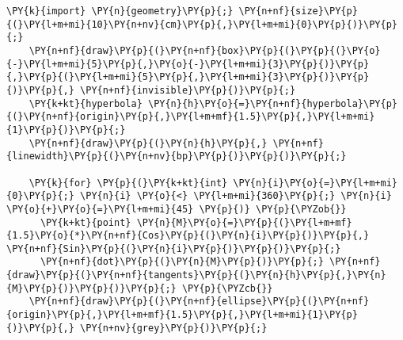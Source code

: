 \begin{Verbatim}[commandchars=\\\{\}]
    \PY{k}{import} \PY{n}{geometry}\PY{p}{;} \PY{n+nf}{size}\PY{p}{(}\PY{l+m+mi}{10}\PY{n+nv}{cm}\PY{p}{,}\PY{l+m+mi}{0}\PY{p}{)}\PY{p}{;}
    \PY{n+nf}{draw}\PY{p}{(}\PY{n+nf}{box}\PY{p}{(}\PY{p}{(}\PY{o}{-}\PY{l+m+mi}{5}\PY{p}{,}\PY{o}{-}\PY{l+m+mi}{3}\PY{p}{)}\PY{p}{,}\PY{p}{(}\PY{l+m+mi}{5}\PY{p}{,}\PY{l+m+mi}{3}\PY{p}{)}\PY{p}{)}\PY{p}{,} \PY{n+nf}{invisible}\PY{p}{)}\PY{p}{;}
    \PY{k+kt}{hyperbola} \PY{n}{h}\PY{o}{=}\PY{n+nf}{hyperbola}\PY{p}{(}\PY{n+nf}{origin}\PY{p}{,}\PY{l+m+mf}{1.5}\PY{p}{,}\PY{l+m+mi}{1}\PY{p}{)}\PY{p}{;}
    \PY{n+nf}{draw}\PY{p}{(}\PY{n}{h}\PY{p}{,} \PY{n+nf}{linewidth}\PY{p}{(}\PY{n+nv}{bp}\PY{p}{)}\PY{p}{)}\PY{p}{;}

    \PY{k}{for} \PY{p}{(}\PY{k+kt}{int} \PY{n}{i}\PY{o}{=}\PY{l+m+mi}{0}\PY{p}{;} \PY{n}{i} \PY{o}{<} \PY{l+m+mi}{360}\PY{p}{;} \PY{n}{i} \PY{o}{+}\PY{o}{=}\PY{l+m+mi}{45} \PY{p}{)} \PY{p}{\PYZob{}}
      \PY{k+kt}{point} \PY{n}{M}\PY{o}{=}\PY{p}{(}\PY{l+m+mf}{1.5}\PY{o}{*}\PY{n+nf}{Cos}\PY{p}{(}\PY{n}{i}\PY{p}{)}\PY{p}{,} \PY{n+nf}{Sin}\PY{p}{(}\PY{n}{i}\PY{p}{)}\PY{p}{)}\PY{p}{;}
      \PY{n+nf}{dot}\PY{p}{(}\PY{n}{M}\PY{p}{)}\PY{p}{;} \PY{n+nf}{draw}\PY{p}{(}\PY{n+nf}{tangents}\PY{p}{(}\PY{n}{h}\PY{p}{,}\PY{n}{M}\PY{p}{)}\PY{p}{)}\PY{p}{;} \PY{p}{\PYZcb{}}
    \PY{n+nf}{draw}\PY{p}{(}\PY{n+nf}{ellipse}\PY{p}{(}\PY{n+nf}{origin}\PY{p}{,}\PY{l+m+mf}{1.5}\PY{p}{,}\PY{l+m+mi}{1}\PY{p}{)}\PY{p}{,} \PY{n+nv}{grey}\PY{p}{)}\PY{p}{;}
\end{Verbatim}
